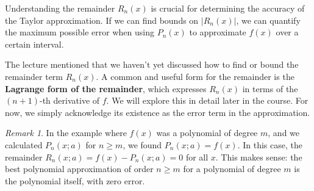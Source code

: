 \documentclass[11pt]{article}
\theoremstyle{definition}
\theoremstyle{remark}
\newtheorem{remark}[theorem]{Remark}
\begin{document}
Understanding the remainder $R_n(x)$ is crucial for determining the accuracy of the Taylor approximation. If we can find bounds on $|R_n(x)|$, we can quantify the maximum possible error when using $P_n(x)$ to approximate $f(x)$ over a certain interval.

The lecture mentioned that we haven't yet discussed how to find or bound the remainder term $R_n(x)$. A common and useful form for the remainder is the \textbf{Lagrange form of the remainder}, which expresses $R_n(x)$ in terms of the $(n+1)$-th derivative of $f$. We will explore this in detail later in the course. For now, we simply acknowledge its existence as the error term in the approximation.

\begin{remark}
In the example where $f(x)$ was a polynomial of degree $m$, and we calculated $P_n(x; a)$ for $n \ge m$, we found $P_n(x; a) = f(x)$. In this case, the remainder $R_n(x; a) = f(x) - P_n(x; a) = 0$ for all $x$. This makes sense: the best polynomial approximation of order $n \ge m$ for a polynomial of degree $m$ is the polynomial itself, with zero error.
\end{remark}
\end{document}
